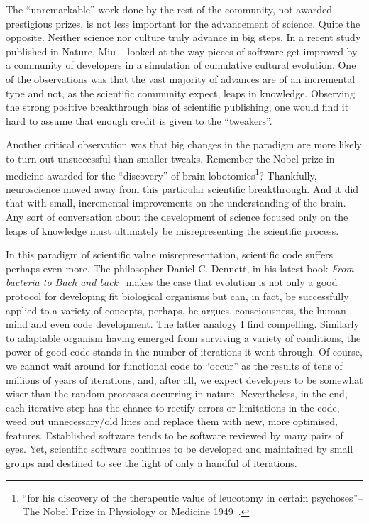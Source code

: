 The ``unremarkable'' work done by the rest of the community, not awarded prestigious prizes, is not less important for the advancement of science. Quite the opposite. Neither science nor culture truly advance in big steps. In a recent study published in Nature, Miu \etal~\cite{Miu2018} looked at the way pieces of software get improved by a community of developers in a simulation of cumulative cultural evolution. One of the observations was that the vast majority of advances are of an incremental type and not, as the scientific community expect, leaps in knowledge. Observing the strong positive breakthrough bias of scientific publishing, one would find it hard to assume that enough credit is given to the ``tweakers''. 

Another critical observation was that big changes in the paradigm are more likely to turn out unsuccessful than smaller tweaks. Remember the Nobel prize in medicine awarded for the ``discovery'' of brain lobotomies\footnote{ ``for his discovery of the therapeutic value of leucotomy in certain psychoses''-- The Nobel Prize in Physiology or Medicine 1949~\cite{Nobel49}.}? Thankfully, neuroscience moved away from this particular scientific breakthrough. And it did that with small, incremental improvements on the understanding of the brain. Any sort of conversation about the development of science focused only on the leaps of knowledge must ultimately be misrepresenting the scientific process.


In this paradigm of scientific value misrepresentation, scientific code suffers perhaps even more. The philosopher Daniel C. Dennett, in his latest book \textit{From bacteria to Bach and back}~\cite{Dennett} makes the case that evolution is not only a good protocol for developing fit biological organisms but can, in fact, be successfully applied to a variety of concepts, perhaps, he argues, consciousness, the human mind and even code development. The latter analogy I find compelling. Similarly to adaptable organism having emerged from surviving a variety of conditions, the power of good code stands in the number of iterations it went through. Of course, we cannot wait around for functional code to ``occur'' as the results of tens of millions of years of iterations, and, after all, we expect developers to be somewhat wiser than the random processes occurring in nature. Nevertheless, in the end, each iterative step has the chance to rectify errors or limitations in the code, weed out unnecessary/old lines and replace them with new, more optimised, features. Established software tends to be software reviewed by many pairs of eyes. Yet, scientific software continues to be developed and  maintained by small groups and destined to see the light of only a handful of iterations.  


